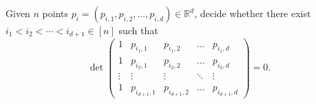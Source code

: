 \begin{problem}[GPT in \(\mathbb{R}^d\),label=problem:gpt-d]
	Given \(n\) points \(p_i = (p_{i,1},p_{i,2}, \ldots, p_{i,d}) \in \mathbb{R}^d\), decide
	whether there exist \(i_1 < i_2 < \cdots < i_{d+1} \in [n]\) such that
	\begin{displaymath}
		\det
		\left(
		\begin{matrix}
			1 & p_{i_1,1} & p_{i_1,2} & \hdots & p_{i_1,d} \\
			1 & p_{i_2,1} & p_{i_2,2} & \hdots & p_{i_2,d} \\
			\vdots & \vdots & \vdots & \ddots & \vdots \\
			1 & p_{i_{d+1},1} & p_{i_{d+1},2} & \hdots & p_{i_{d+1},d}
		\end{matrix}
		\right)
		= 0.
	\end{displaymath}
\end{problem}
